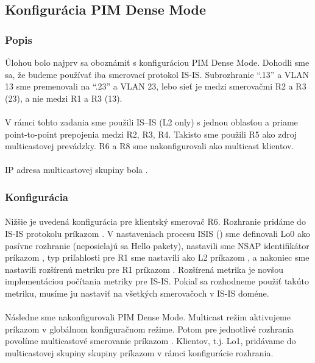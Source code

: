 \documentclass[12pt,twoside,a4paper]{report}
\begin{document}
\subsection{Konfigurácia PIM Dense Mode}
\label{konfiguracia_pim_dense_mode}
\subsubsection{Popis}
Úlohou bolo najprv sa oboznámiť s konfiguráciou PIM Dense Mode. Dohodli sme sa, že budeme používať iba smerovací protokol IS-IS.
Subrozhranie “.13” a VLAN 13 sme premenovali na “.23” a VLAN 23, lebo sieť je medzi smerovačmi R2 a R3 (23), a nie medzi R1 a R3 (13).

\paragraph{}
V rámci tohto zadania sme použili IS–IS (L2 only) s jednou oblasťou a priame point-to-point prepojenia medzi R2, R3, R4. Takisto sme použili R5 ako zdroj multicastovej prevádzky. R6 a R8 sme nakonfigurovali ako multicast klientov.

\paragraph{}
IP adresa multicastovej skupiny bola .


\subsubsection{Konfigurácia}
\paragraph{}
Nižšie je uvedená konfigurácia pre klientský smerovač R6. Rozhranie pridáme do IS-IS protokolu príkazom . V nastaveniach procesu ISIS () sme definovali Lo0 ako pasívne rozhranie (neposielajú sa Hello pakety), nastavili sme NSAP identifikátor príkazom , typ priľahlosti pre R1 sme nastavili ako L2 príkazom , a nakoniec sme nastavili rozšírenú metriku pre R1 príkazom . Rozšírená metrika je novšou implementáciou počítania metriky pre IS-IS. Pokiaľ sa rozhodneme použiť takúto metriku, musíme ju nastaviť na všetkých smerovačoch v IS-IS doméne.

\paragraph{}
Následne sme nakonfigurovali PIM Dense Mode. Multicast režim aktivujeme príkazom  v globálnom konfiguračnom režime. Potom pre jednotlivé rozhrania povolíme multicastové smerovanie príkazom . Klientov, t.j. Lo1, pridávame do multicastovej skupiny skupiny príkazom  v rámci konfigurácie rozhrania.
\end{document}
